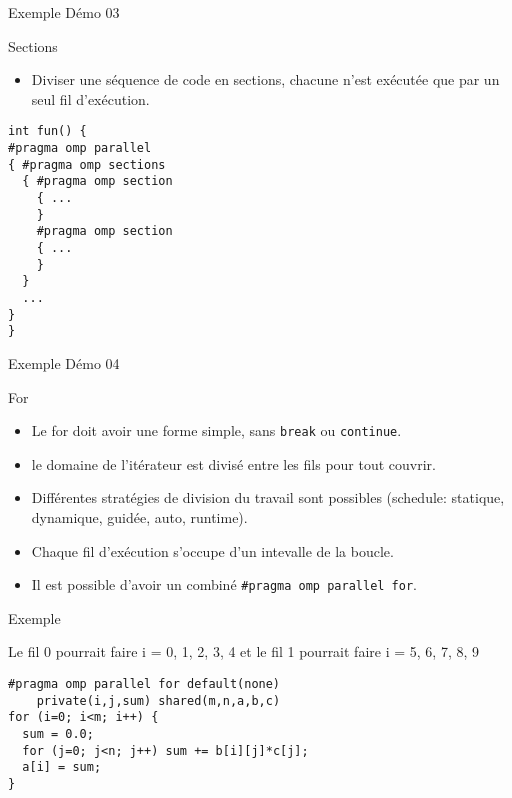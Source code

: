 \documentclass[10pt]{beamer}
\begin{document}
\begin{frame}[fragile]{Exemple}
Démo 03
\end{frame}

\begin{frame}{Sections}

  \begin{itemize}
    \item Diviser une séquence de code en sections, chacune n'est exécutée que par un seul fil d'exécution.
  \end{itemize}
  \begin{verbatim}
int fun() {
#pragma omp parallel
{ #pragma omp sections
  { #pragma omp section
    { ...
    }
    #pragma omp section
    { ...
    }
  }
  ...
}
}
  \end{verbatim}
\end{frame}

\begin{frame}[fragile]{Exemple}
Démo 04
\end{frame}

\begin{frame}[fragile]{For}

  \begin{itemize}
    \item Le for doit avoir une forme simple, sans \texttt{break} ou \texttt{continue}.

    \item le domaine de l'itérateur est divisé entre les fils pour tout couvrir.

    \item Différentes stratégies de division du travail sont possibles (schedule: statique, dynamique, guidée, auto, runtime).

    \item Chaque fil d'exécution s'occupe d'un intevalle de la boucle.

    \item Il est possible d'avoir un combiné \texttt{\#pragma omp parallel for}.
  \end{itemize}
\end{frame}

\begin{frame}[fragile]{Exemple}

Le fil 0 pourrait faire i = 0, 1, 2, 3, 4 et le fil 1 pourrait faire i = 5, 6, 7, 8, 9
  \begin{verbatim}
#pragma omp parallel for default(none) 
    private(i,j,sum) shared(m,n,a,b,c)
for (i=0; i<m; i++) {
  sum = 0.0;
  for (j=0; j<n; j++) sum += b[i][j]*c[j];
  a[i] = sum;
}
  \end{verbatim}
\end{frame}
\end{document}
